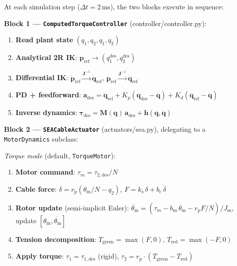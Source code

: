 \documentclass[11pt,a4paper]{article}
\newcommand{\rp}{r_{\mathrm{p}}}
\newcommand{\bq}{\bm{q}}
\newcommand{\btau}{\bm{\tau}}
\newcommand{\bM}{\bm{M}}
\newcommand{\bh}{\bm{h}}
\newcommand{\bJ}{\bm{J}}
\newcommand{\ks}{k_{\mathrm{s}}}
\newcommand{\bc}{b_{\mathrm{c}}}
\newcommand{\Jm}{J_{\mathrm{m}}}
\newcommand{\thetam}{\theta_{\mathrm{m}}}
\begin{document}
At each simulation step ($\Delta t = 2$\,ms), the two blocks execute in sequence:

\medskip
\textbf{Block 1 --- \texttt{ComputedTorqueController}} (controller/controller.py):
\begin{enumerate}[leftmargin=2em]
    \item \textbf{Read plant state} $(q_1, q_2, \dot{q}_1, \dot{q}_2)$
    \item \textbf{Analytical 2R IK}: $\bm{p}_{\mathrm{ref}} \to (q_{1}^{\mathrm{des}}, q_{2}^{\mathrm{des}})$
    \item \textbf{Differential IK}: $\dot{\bm{p}}_{\mathrm{ref}} \xrightarrow{\bJ^{-1}} \dot{\bq}_{\mathrm{ref}}$, \quad $\ddot{\bm{p}}_{\mathrm{ref}} \xrightarrow{\bJ^{-1}} \ddot{\bq}_{\mathrm{ref}}$
    \item \textbf{PD + feedforward}: $\bm{a}_{\mathrm{des}} = \ddot{\bq}_{\mathrm{ref}} + K_p(\bq_{\mathrm{des}} - \bq) + K_d(\dot{\bq}_{\mathrm{ref}} - \dot{\bq})$
    \item \textbf{Inverse dynamics}: $\btau_{\mathrm{des}} = \bM(\bq)\,\bm{a}_{\mathrm{des}} + \bh(\bq, \dot{\bq})$
\end{enumerate}

\textbf{Block 2 --- \texttt{SEACableActuator}} (actuators/sea.py), delegating to a \texttt{MotorDynamics} subclass:

\medskip
\textit{Torque mode} (default, \texttt{TorqueMotor}):
\begin{enumerate}[leftmargin=2em, start=6]
    \item \textbf{Motor command}: $\tau_m = \tau_{2,\mathrm{des}} / N$
    \item \textbf{Cable force}: $\delta = \rp(\thetam/N - q_2)$, \quad $F = \ks\,\delta + \bc\,\dot{\delta}$
    \item \textbf{Rotor update} (semi-implicit Euler): $\ddot{\thetam} = (\tau_m - b_{\mathrm{m}}\,\dot{\thetam} - \rp F/N) / \Jm$, \quad update $[\thetam, \dot{\thetam}]$
    \item \textbf{Tension decomposition}: $T_{\mathrm{green}} = \max(F, 0)$, \quad $T_{\mathrm{red}} = \max(-F, 0)$
    \item \textbf{Apply torque}: $\tau_1 = \tau_{1,\mathrm{des}}$ (rigid), \quad $\tau_2 = \rp \cdot (T_{\mathrm{green}} - T_{\mathrm{red}})$
\end{enumerate}
\end{document}
